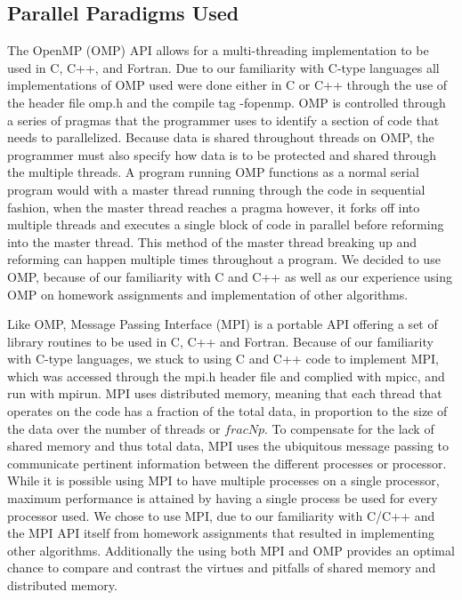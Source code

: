 \documentclass[conference,12pt]{IEEEtran}
\begin{document}
	\subsection{Parallel Paradigms Used}
		The OpenMP (OMP) API allows for a multi-threading implementation to be used in C, C++, and Fortran.  Due to our familiarity with C-type languages all implementations of OMP used were done either in C or C++ through the use of the header file omp.h and the compile tag 
		-fopenmp.  OMP is controlled through a series of pragmas that the programmer uses to identify a section of code that needs to parallelized.  Because data is shared throughout threads on OMP, the programmer must also specify how data is to be protected and shared through
		the multiple threads.  A program running OMP functions as a normal serial program would with a master thread running through the code in sequential fashion, when the master thread reaches a pragma however, it forks off into multiple threads and executes a single block 
		of code in parallel before reforming into the master thread.  This method of the master thread breaking up and reforming can happen multiple times throughout a program. We decided to use OMP, because of our familiarity with C and C++ as well as our experience using OMP 
		on homework assignments and implementation of other algorithms.  

		Like OMP, Message Passing Interface (MPI) is a portable API offering a set of library routines to be used in C, C++ and Fortran. Because of our familiarity with C-type languages, we stuck to using C and C++ code to implement MPI, which was accessed through the mpi.h header file
		and complied with mpicc, and run with mpirun.  MPI uses distributed memory, meaning that each thread that operates on the code has a fraction of the total data, in proportion to the size of the data over the number of threads or $frac{N}{p}$.  To compensate for the lack
		of shared memory and thus total data, MPI uses the ubiquitous message passing to communicate pertinent information between the different processes or processor.  While it is possible using MPI to have multiple processes on a single processor, maximum performance is attained 
		by having a single process be used for every processor used.  We chose to use MPI, due to our familiarity with C/C++ and the MPI API itself from homework assignments that resulted in implementing other algorithms.  Additionally the using both MPI and OMP provides an optimal
		chance to compare and contrast the virtues and pitfalls of shared memory and distributed memory.
\end{document}
